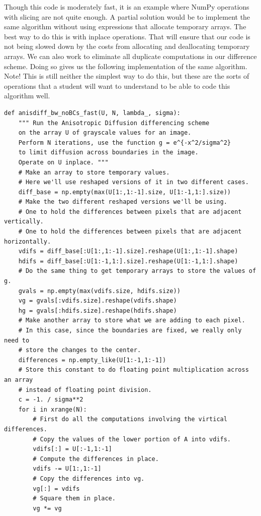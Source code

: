 Though this code is moderately fast, it is an example where NumPy operations with slicing are not quite enough.
A partial solution would be to implement the same algorithm without using expressions that allocate temporary arrays.
The best way to do this is with inplace operations.
That will ensure that our code is not being slowed down by the costs from allocating and deallocating temporary arrays.
We can also work to eliminate all duplicate computations in our difference scheme.
Doing so gives us the following implementation of the same algorithm.
Note! This is still neither the simplest way to do this, but these are the sorts of operations that a student will want to understand to be able to code this algorithm well.
\begin{lstlisting}
def anisdiff_bw_noBCs_fast(U, N, lambda_, sigma):
    """ Run the Anisotropic Diffusion differencing scheme
    on the array U of grayscale values for an image.
    Perform N iterations, use the function g = e^{-x^2/sigma^2}
    to limit diffusion across boundaries in the image.
    Operate on U inplace. """
    # Make an array to store temporary values.
    # Here we'll use reshaped versions of it in two different cases.
    diff_base = np.empty(max(U[1:,1:-1].size, U[1:-1,1:].size))
    # Make the two different reshaped versions we'll be using.
    # One to hold the differences between pixels that are adjacent vertically.
    # One to hold the differences between pixels that are adjacent horizontally.
    vdifs = diff_base[:U[1:,1:-1].size].reshape(U[1:,1:-1].shape)
    hdifs = diff_base[:U[1:-1,1:].size].reshape(U[1:-1,1:].shape)
    # Do the same thing to get temporary arrays to store the values of g.
    gvals = np.empty(max(vdifs.size, hdifs.size))
    vg = gvals[:vdifs.size].reshape(vdifs.shape)
    hg = gvals[:hdifs.size].reshape(hdifs.shape)
    # Make another array to store what we are adding to each pixel.
    # In this case, since the boundaries are fixed, we really only need to
    # store the changes to the center.
    differences = np.empty_like(U[1:-1,1:-1])
    # Store this constant to do floating point multiplication across an array
    # instead of floating point division.
    c = -1. / sigma**2
    for i in xrange(N):
        # First do all the computations involving the virtical differences.
        # Copy the values of the lower portion of A into vdifs.
        vdifs[:] = U[:-1,1:-1]
        # Compute the differences in place.
        vdifs -= U[1:,1:-1]
        # Copy the differences into vg.
        vg[:] = vdifs
        # Square them in place.
        vg *= vg

\end{lstlisting}
